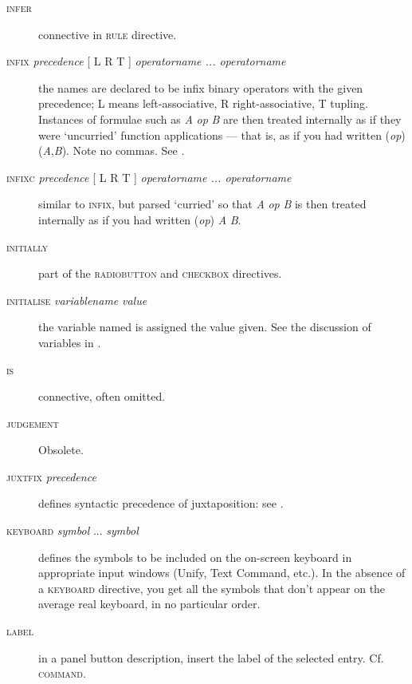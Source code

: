 \begin{description}
\item[\textsc{ infer }] connective in \textsc{rule} directive.

\item[\textsc{infix} \textit{precedence} \textsc{[} L {\textbar} R {\textbar} T \textsc{]} \textit{operatorname ... operatorname}] the names are declared to be infix binary operators with the given precedence; L means left-associative, R right-associative, T tupling. Instances of formulae such as \textit{A} \textit{op} \textit{B} are then treated internally as if they were `uncurried' function applications --- that is, as if you had written (\textit{op})(\textit{A},\textit{B}). Note no commas. See .

\item[\textsc{infixc} \textit{precedence} \textsc{[} L {\textbar} R {\textbar} T \textsc{]} \textit{operatorname ... operatorname}] similar to \textsc{infix}, but parsed `curried' so that \textit{A} \textit{op} \textit{B} is then treated internally as if you had written (\textit{op}) \textit{A} \textit{B}.

\item[\textsc{initially}] part of the \textsc{radiobutton} and \textsc{checkbox} directives.

\item[\textsc{initialise} \textit{variablename} \textit{value}] the variable named is assigned the value given. See the discussion of variables in .

\item[\textsc{is}] connective, often omitted.

\item[\textsc{judgement}] Obsolete.

\item[\textsc{juxtfix} \textit{precedence}] defines syntactic precedence of juxtaposition: see .

\item[\textsc{keyboard} \textit{symbol} ... \textit{symbol}] defines the symbols to be included on the on-screen keyboard in appropriate input windows (Unify, Text Command, etc.). In the absence of a \textsc{keyboard} directive, you get all the symbols that don't appear on the average real keyboard, in no particular order.

\item[\textsc{label}] in a panel button description, insert the label of the selected entry. Cf. \textsc{command}.


\end{description}
